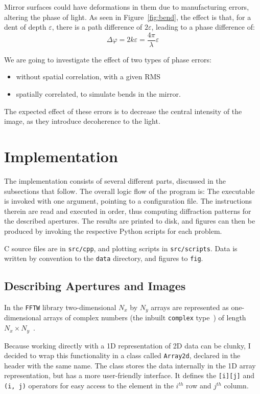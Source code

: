 \documentclass[11pt]{article}
\newcommand{\eps}{\varepsilon}
\newcommand{\ph}{\varphi}
\newcommand{\CC}{{C\nolinebreak[4]\hspace{-.05em}\raisebox{.3ex}{\scriptsize\bf ++}}}
\begin{document}
Mirror surfaces could have deformations in them due to manufacturing errors, altering the phase of light. As seen in Figure~\ref{fig:bend}, the effect is that, for a dent of depth $\eps$, there is a path difference of $2\eps$, leading to a phase difference of:
\begin{equation}
    \Delta\ph = 2k\eps = \frac{4\pi}{\lambda}\eps
\end{equation}

We are going to investigate the effect of two types of phase errors:
\begin{itemize}
    \item without spatial correlation, with a given RMS
    \item spatially correlated, to simulate bends in the mirror.
\end{itemize}

The expected effect of these errors is to decrease the central intensity of the image, as they introduce decoherence to the light.

\section{Implementation}\label{sec:impl}
The implementation consists of several different parts, discussed in the subsections that follow. The overall logic flow of the program is:
The executable is invoked with one argument, pointing to a configuration file. The instructions therein are read and executed in order, thus computing diffraction patterns for the described apertures. The results are printed to disk, and figures can then be produced by invoking the respective Python scripts for each problem.

\CC{} source files are in \texttt{src/cpp}, and plotting scripts in \texttt{src/scripts}. Data is written by convention to the \texttt{data} directory, and figures to \texttt{fig}.

\subsection{Describing Apertures and Images}
In the \texttt{FFTW} library two-dimensional $N_x$ by $N_y$ arrays are represented as one-dimensional arrays of complex numbers (the inbuilt \texttt{complex} type~\cite{cppcomplex}) of length $N_x \times N_y$~\cite[Section 3.2]{fftw}.

Because working directly with a 1D representation of 2D data can be clunky, I decided to wrap this functionality in a class called \texttt{Array2d}, declared in the header with the same name. The class stores the data internally in the 1D array representation, but has a more user-friendly interface. It defines the \texttt{[i][j]} and \texttt{(i, j)} operators for easy access to the element in the $i^{th}$ row and $j^{th}$ column.
\end{document}
